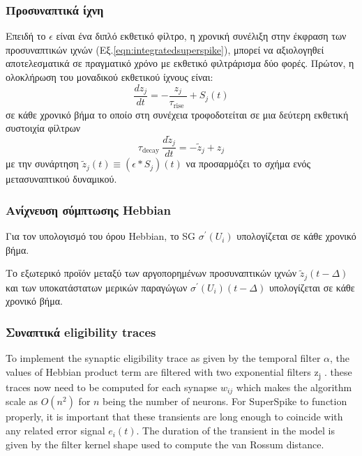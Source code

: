\documentclass[12pt]{report}
\begin{document}
\subsubsection{Προσυναπτικά ίχνη}
Επειδή το  $\epsilon$ είναι ένα διπλό εκθετικό φίλτρο, η χρονική συνέλιξη στην έκφραση των προσυναπτικών ιχνών (Εξ.\ref{eqn:integratedsuperspike}), μπορεί να αξιολογηθεί αποτελεσματικά σε πραγματικό χρόνο με εκθετικό φιλτράρισμα δύο φορές. Πρώτον, η ολοκλήρωση του μοναδικού εκθετικού ίχνους είναι:
\begin{equation}
\frac{d z_{j}}{d t}=-\frac{z_{j}}{\tau_{\text {rise }}}+S_{j}(t)
\end{equation}
σε κάθε χρονικό βήμα το οποίο στη συνέχεια τροφοδοτείται σε μια δεύτερη εκθετική συστοιχία φίλτρων
\begin{equation}
\tau_{\text {decay }} \frac{d \tilde{z}_{j}}{d t}=-\tilde{z}_{j}+z_{j}
\end{equation}
με την συνάρτηση $\tilde{z}_{j}(t) \equiv\left(\epsilon * S_{j}\right)(t)$ να προσαρμόζει το σχήμα ενός μετασυναπτικού δυναμικού.
\subsubsection{Ανίχνευση σύμπτωσης \textlatin{Hebbian}}
Για τον υπολογισμό του όρου \textlatin{Hebbian}, το \textlatin{SG} $\sigma^{\prime}\left(U_{i}\right)$ υπολογίζεται σε κάθε χρονικό βήμα.

Το εξωτερικό προϊόν μεταξύ των αργοπορημένων προσυναπτικών ιχνών $\tilde{z}_{j}(t-\Delta)$ και των υποκατάστατων μερικών παραγώγων $\sigma^{\prime}\left(U_{i}\right)(t-\Delta)$  υπολογίζεται σε κάθε χρονικό βήμα.
\subsubsection{Συναπτικά \textlatin{eligibility traces} }
To implement the synaptic eligibility trace as given by the temporal filter $\alpha$, the values of Hebbian product term are filtered with two exponential filters z\textsubscript{j} . these traces now need to be computed for each synapse $w_{i j}$ which makes the algorithm scale as $O\left(n^{2}\right)$ for $n$ being the number of neurons. For SuperSpike to function properly, it is important that these transients are long enough to coincide with any related error signal $e_{i}(t)$. The duration of the transient in the model is given by the filter kernel shape used to compute the van Rossum distance.
\end{document}
